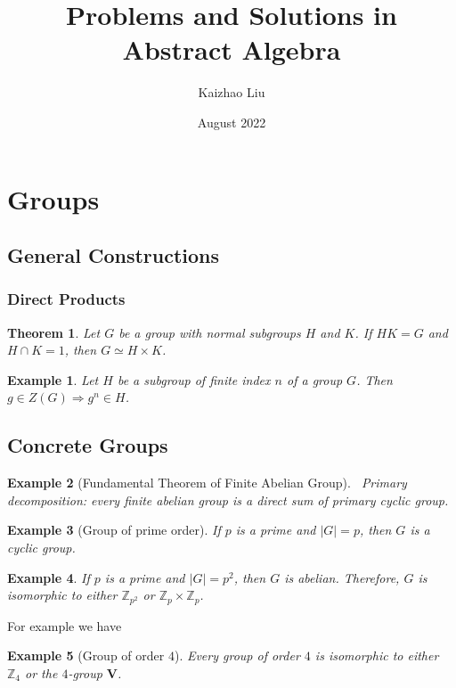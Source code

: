 \documentclass{article}
\title{Problems and Solutions in Abstract Algebra}
\author{Kaizhao Liu}
\date{August 2022}
\newtheorem{Thm}{Theorem}[section]
\newtheorem{Eg}{Example}[section]
\theoremstyle{definition}
\begin{document}
\maketitle
\tableofcontents

\section{Groups}
\subsection{General Constructions}





\subsubsection{Direct Products}
\begin{Thm}
Let $G$ be a group with normal subgroups $H$ and $K$. If $HK=G$ and $H\cap K=1$, then $G\simeq H\times K$.
\end{Thm}

\begin{Eg}
Let $H$ be a subgroup of finite index $n$ of a group $G$. Then $g\in Z(G)\Longrightarrow g^n\in H$.
\end{Eg}

\subsection{Concrete Groups}
\begin{Eg}[Fundamental Theorem of Finite Abelian Group]
    \,\newline
    Primary decomposition: every finite abelian group is a direct sum of primary cyclic group.
    \newline
\end{Eg}

\begin{Eg}[Group of prime order]
    If $p$ is a prime and $\left|G\right|=p$, then $G$ is a cyclic group.
\end{Eg}

\begin{Eg}
    If $p$ is a prime and $\left|G\right|=p^2$, then $G$ is abelian. Therefore, $G$ is isomorphic to either $\mathbb{Z}_{p^2}$ or $\mathbb{Z}_{p}\times\mathbb{Z}_{p}$.
\end{Eg}
For example we have
\begin{Eg}[Group of order $4$]
    Every group of order $4$ is isomorphic to either $\mathbb{Z}_4$ or the $4$-group $\mathbf{V}$.
\end{Eg}
\end{document}
